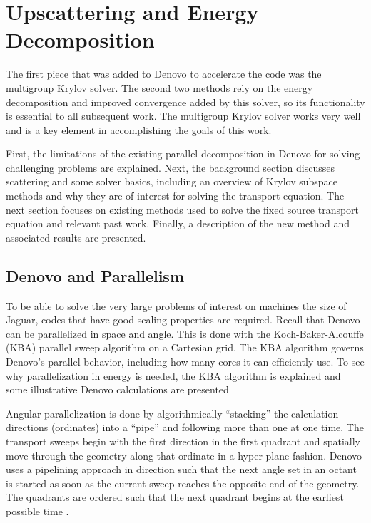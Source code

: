 
\chapter{Upscattering and Energy Decomposition}
\label{sec:Chp2}
The first piece that was added to Denovo to accelerate the code was the multigroup Krylov solver. The second two methods rely on the energy decomposition and improved convergence added by this solver, so its functionality is essential to all subsequent work. The multigroup Krylov solver works very well and is a key element in accomplishing the goals of this work. 

First, the limitations of the existing parallel decomposition in Denovo for solving challenging problems are explained. Next, the background section discusses scattering and some solver basics, including an overview of Krylov subspace methods and why they are of interest for solving the transport equation. The next section focuses on existing methods used to solve the fixed source transport equation and relevant past work. Finally, a description of the new method and associated results are presented.

\section{Denovo and Parallelism}
\label{sec:DenAndPar}
To be able to solve the very large problems of interest on machines the size of Jaguar, codes that have good scaling properties are required. Recall that Denovo can be parallelized in space and angle. This is done with the Koch-Baker-Alcouffe (KBA)\cite{Baker1998} parallel sweep algorithm on a Cartesian grid. The KBA algorithm governs Denovo's parallel behavior, including how many cores it can efficiently use. To see why parallelization in energy is needed, the KBA algorithm is explained and some illustrative Denovo calculations are presented

Angular parallelization is done by algorithmically ``stacking'' the calculation directions (ordinates) into a ``pipe'' and following more than one at one time. The transport sweeps begin with the first direction in the first quadrant and spatially move through the geometry along that ordinate in a hyper-plane fashion. Denovo uses a pipelining approach in direction such that the next angle set in an octant is started as soon as the current sweep reaches the opposite end of the geometry. The quadrants are ordered such that the next quadrant begins at the earliest possible time \cite{Evans2009d}. 

